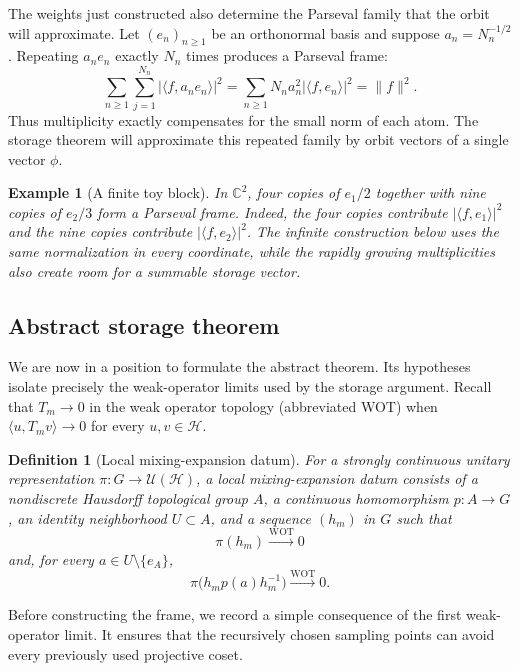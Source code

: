 \documentclass[10pt,a4paper]{amsart}
\numberwithin{equation}{section}
\newtheorem{definition}[theorem]{Definition}
\newtheorem{example}[theorem]{Example}
\newcommand{\cH}{\mathcal H}
\newcommand{\U}{\mathcal U}
\begin{document}
The weights just constructed also determine the Parseval family that the
orbit will approximate.  Let $(e_n)_{n\geq1}$ be an orthonormal basis and suppose
$a_n=N_n^{-1/2}$.  Repeating $a_ne_n$ exactly $N_n$ times produces a
Parseval frame:
\begin{equation}\label{eq:model-parseval-calculation}
 \sum_{n\geq1}\sum_{j=1}^{N_n}
 |\langle f,a_ne_n\rangle|^2
 =\sum_{n\geq1}N_na_n^2|\langle f,e_n\rangle|^2
 =\|f\|^2.
\end{equation}
Thus multiplicity exactly compensates for the small norm of each atom.  The
storage theorem will approximate this repeated family by orbit vectors of a
single vector $\phi$.

\begin{example}[A finite toy block]\label{ex:finite-parseval-block}
In $\mathbb C^2$, four copies of $e_1/2$ together with nine copies of
$e_2/3$ form a Parseval frame.  Indeed, the four copies contribute
$|\langle f,e_1\rangle|^2$ and the nine copies contribute
$|\langle f,e_2\rangle|^2$.  The infinite construction below uses the same
normalization in every coordinate, while the rapidly growing multiplicities
also create room for a summable storage vector.
\end{example}

\subsection{Abstract storage theorem}

We are now in a position to formulate the abstract theorem.  Its hypotheses
isolate precisely the weak-operator limits used by the storage argument.
Recall that $T_m\to0$ in the weak operator topology
(abbreviated WOT) when $\langle u,T_mv\rangle\to0$ for every $u,v\in\cH$.

\begin{definition}[Local mixing-expansion datum]
\label{def:mixing-expansion}
For a strongly continuous unitary representation $\pi:G\to\U(\cH)$, a
\emph{local mixing-expansion datum} consists of a nondiscrete Hausdorff
topological group $A$, a continuous homomorphism $p:A\to G$, an identity
neighborhood $U\subset A$, and a sequence $(h_m)$ in $G$ such that
\[
 \pi(h_m)\xrightarrow{\mathrm{WOT}}0
\]
and, for every $a\in U\setminus\{e_A\}$,
\[
 \pi\bigl(h_mp(a)h_m^{-1}\bigr)\xrightarrow{\mathrm{WOT}}0.
\]
\end{definition}

Before constructing the frame, we record a simple consequence of the first
weak-operator limit.  It ensures that the recursively chosen sampling points
can avoid every previously used projective coset.
\end{document}
